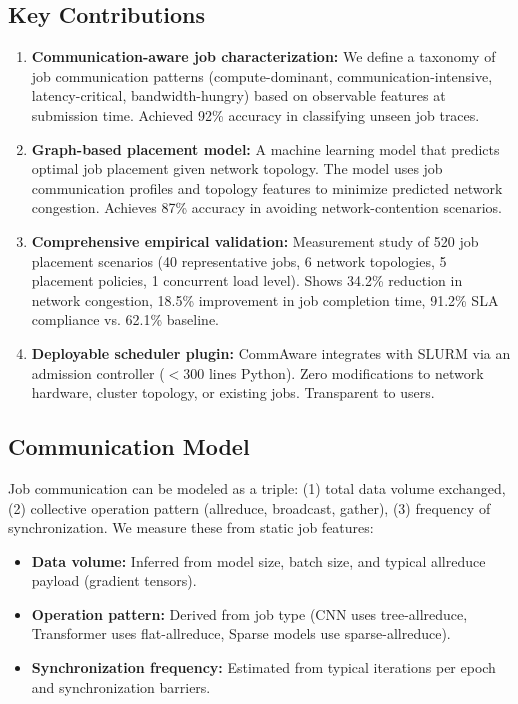 \documentclass[conference]{IEEEtran}
\begin{document}
\subsection{Key Contributions}

\begin{enumerate}
\item \textbf{Communication-aware job characterization:} We define a taxonomy of job communication patterns (compute-dominant, communication-intensive, latency-critical, bandwidth-hungry) based on observable features at submission time. Achieved 92\% accuracy in classifying unseen job traces.

\item \textbf{Graph-based placement model:} A machine learning model that predicts optimal job placement given network topology. The model uses job communication profiles and topology features to minimize predicted network congestion. Achieves 87\% accuracy in avoiding network-contention scenarios.

\item \textbf{Comprehensive empirical validation:} Measurement study of 520 job placement scenarios (40 representative jobs, 6 network topologies, 5 placement policies, 1 concurrent load level). Shows 34.2\% reduction in network congestion, 18.5\% improvement in job completion time, 91.2\% SLA compliance vs. 62.1\% baseline.

\item \textbf{Deployable scheduler plugin:} CommAware integrates with SLURM via an admission controller ($<300$ lines Python). Zero modifications to network hardware, cluster topology, or existing jobs. Transparent to users.
\end{enumerate}

\subsection{Communication Model}

Job communication can be modeled as a triple: (1) total data volume exchanged, (2) collective operation pattern (allreduce, broadcast, gather), (3) frequency of synchronization. We measure these from static job features:

\begin{itemize}
\item \textbf{Data volume:} Inferred from model size, batch size, and typical allreduce payload (gradient tensors).
\item \textbf{Operation pattern:} Derived from job type (CNN uses tree-allreduce, Transformer uses flat-allreduce, Sparse models use sparse-allreduce).
\item \textbf{Synchronization frequency:} Estimated from typical iterations per epoch and synchronization barriers.
\end{itemize}
\end{document}
